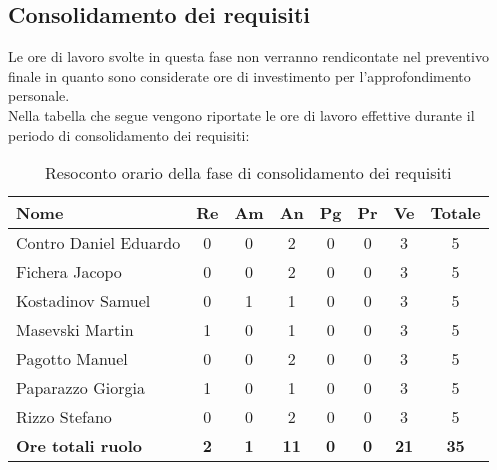 \documentclass[../piano_di_progetto.tex]{subfiles}
\begin{document}
\subsection{Consolidamento dei requisiti}%
\label{sub:cons_cons_req}
Le ore di lavoro svolte in questa fase non verranno rendicontate nel preventivo finale in quanto sono considerate ore di investimento per l'approfondimento personale.\\
Nella tabella che segue vengono riportate le ore di lavoro effettive durante il periodo di consolidamento dei requisiti: \\

\begin{table}[H]
	\centering
	\begin{tabular}{|l|c|c|c|c|c|c|c|}
	\hline
	\rowcolor{lightgray}
	\textbf{Nome} & \textbf{Re} & \textbf{Am} & \textbf{An} & \textbf{Pg}  & \textbf{Pr}   & \textbf{Ve} & \textbf{Totale}\\
	\hline
	Contro Daniel Eduardo & 0 & 0 & 2 & 0 & 0 & 3 & 5 \\
	Fichera Jacopo & 0 & 0 & 2 & 0 & 0 & 3 & 5 \\
	Kostadinov Samuel & 0 & 1 & 1 & 0 & 0 & 3 & 5 \\			
	Masevski Martin & 1 & 0 & 1 & 0 & 0 & 3 & 5 \\
	Pagotto Manuel & 0 & 0 & 2 & 0 & 0 & 3 & 5 \\			
	Paparazzo Giorgia & 1 & 0 & 1 & 0 & 0 & 3 & 5 \\
	Rizzo Stefano & 0 & 0 & 2 & 0 & 0 & 3 & 5 \\
	\hline
	\textbf{Ore totali ruolo} & \textbf{2} & \textbf{1} & \textbf{11} & \textbf{0} & \textbf{0} & \textbf{21} & \textbf{35} \\
	\hline
	\end{tabular}
	\caption{Resoconto orario della fase di consolidamento dei requisiti}
\end{table}
\end{document}
